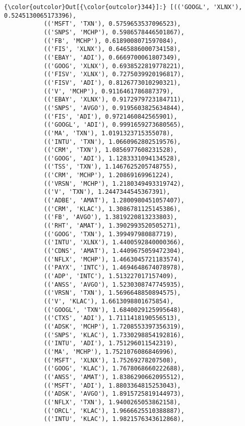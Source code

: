 \documentclass[11pt]{article}
\begin{document}
\begin{Verbatim}[commandchars=\\\{\}]
{\color{outcolor}Out[{\color{outcolor}344}]:} [(('GOOGL', 'XLNX'), 0.5245130065173396),
           (('MSFT', 'TXN'), 0.5759653537096523),
           (('SNPS', 'MCHP'), 0.5986578446501867),
           (('FB', 'MCHP'), 0.6189008071597084),
           (('FIS', 'XLNX'), 0.6465886000734158),
           (('EBAY', 'ADI'), 0.6669700061807349),
           (('GOOG', 'XLNX'), 0.6938522819778221),
           (('FISV', 'XLNX'), 0.7275039920196817),
           (('FISV', 'ADI'), 0.8126773010290321),
           (('V', 'MCHP'), 0.9116461786887379),
           (('EBAY', 'XLNX'), 0.9172979723184711),
           (('SNPS', 'AVGO'), 0.9195603825634844),
           (('FIS', 'ADI'), 0.9721460842565901),
           (('GOOGL', 'ADI'), 0.9991659273680565),
           (('MA', 'TXN'), 1.0191323715355078),
           (('INTU', 'TXN'), 1.0660962802519576),
           (('CRM', 'TXN'), 1.0856977608231528),
           (('GOOG', 'ADI'), 1.1283331094134528),
           (('TSS', 'TXN'), 1.1467625205748755),
           (('CRM', 'MCHP'), 1.20869169961224),
           (('VRSN', 'MCHP'), 1.2180349493319742),
           (('V', 'TXN'), 1.2447344545367391),
           (('ADBE', 'AMAT'), 1.2800980451057407),
           (('CRM', 'KLAC'), 1.3086781125145386),
           (('FB', 'AVGO'), 1.3819220813233803),
           (('RHT', 'AMAT'), 1.3902993520505271),
           (('GOOG', 'TXN'), 1.399497980887719),
           (('INTU', 'XLNX'), 1.4400592840000366),
           (('CDNS', 'AMAT'), 1.4409675059472304),
           (('NFLX', 'MCHP'), 1.4663045721183574),
           (('PAYX', 'INTC'), 1.4694648674078978),
           (('ADP', 'INTC'), 1.513227017157409),
           (('ANSS', 'AVGO'), 1.5230308747745935),
           (('VRSN', 'TXN'), 1.5696648850894575),
           (('V', 'KLAC'), 1.6613098801675854),
           (('GOOGL', 'TXN'), 1.6840029125995648),
           (('CTXS', 'ADI'), 1.7111418190556513),
           (('ADSK', 'MCHP'), 1.7208553397356319),
           (('SNPS', 'KLAC'), 1.7330298854192816),
           (('INTU', 'ADI'), 1.751296011542319),
           (('MA', 'MCHP'), 1.7521076086846996),
           (('MSFT', 'XLNX'), 1.75269278207508),
           (('GOOG', 'KLAC'), 1.7678068660222688),
           (('ANSS', 'AMAT'), 1.8386290662095512),
           (('MSFT', 'ADI'), 1.8803364815253043),
           (('ADSK', 'AVGO'), 1.8915725819144973),
           (('NFLX', 'TXN'), 1.9400265053862158),
           (('ORCL', 'KLAC'), 1.9666625510388887),
           (('INTU', 'KLAC'), 1.9821576343612868),

\end{Verbatim}
\end{document}
